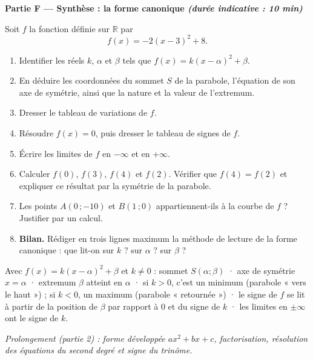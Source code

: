 \documentclass[11pt,a4paper]{article}
\newcommand{\R}{\mathbb{R}}
\newcommand{\partie}[2]{%
  \vspace{6pt}
  \noindent\colorbox{blue!12}{\parbox{\dimexpr\linewidth-2\fboxsep}{%
    \bfseries\color{blue!50!black} #1 \hfill \normalfont\small\itshape (durée indicative : #2)}}%
  \vspace{4pt}}
\begin{document}
\partie{Partie F — Synthèse : la forme canonique}{10 min}

Soit $f$ la fonction définie sur $\R$ par
\[
  f(x)=-2(x-3)^2+8 .
\]

\begin{enumerate}[leftmargin=1.4em,itemsep=3pt]
  \item Identifier les réels $k$, $\alpha$ et $\beta$ tels que $f(x)=k(x-\alpha)^2+\beta$.

  \item En déduire les coordonnées du sommet $S$ de la parabole, l'équation de son axe de symétrie,
  ainsi que la nature et la valeur de l'extremum.

  \item Dresser le tableau de variations de $f$.

  \item Résoudre $f(x)=0$, puis dresser le tableau de signes de $f$.

  \item Écrire les limites de $f$ en $-\infty$ et en $+\infty$.

  \item Calculer $f(0)$, $f(3)$, $f(4)$ et $f(2)$. Vérifier que $f(4)=f(2)$ et expliquer ce résultat
  par la symétrie de la parabole.

  \item Les points $A(0\,;-10)$ et $B(1\,;0)$ appartiennent-ils à la courbe de $f$ ? Justifier par un calcul.

  \item \textbf{Bilan.} Rédiger en trois lignes maximum la méthode de lecture de la forme canonique :
  que lit-on sur $k$ ? sur $\alpha$ ? sur $\beta$ ?
\end{enumerate}

\begin{retenir}
Avec $f(x)=k(x-\alpha)^2+\beta$ et $k\neq 0$ :
sommet $S(\alpha;\beta)$ · axe de symétrie $x=\alpha$ · extremum $\beta$ atteint en $\alpha$ ·
si $k>0$, c'est un minimum (parabole « vers le haut ») ; si $k<0$, un maximum (parabole « retournée ») ·
le signe de $f$ se lit à partir de la position de $\beta$ par rapport à $0$ et du signe de $k$ ·
les limites en $\pm\infty$ ont le signe de $k$.
\end{retenir}

\vfill
{\small\itshape Prolongement (partie 2) : forme développée $ax^2+bx+c$, factorisation, résolution des équations
du second degré et signe du trinôme.}
\end{document}
